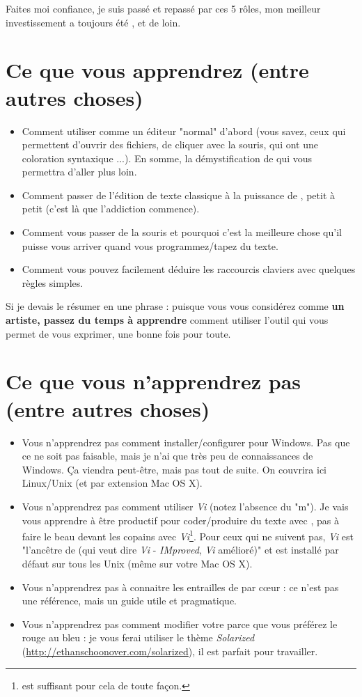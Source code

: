 Faites moi confiance, je suis passé et repassé par ces 5 rôles, mon meilleur investissement a toujours été \vim, et de loin.

\section{Ce que vous apprendrez (entre autres choses)}

\begin{itemize}
    \item Comment utiliser \vim comme un éditeur "normal" d'abord (vous savez, ceux qui permettent d'ouvrir des fichiers, de cliquer avec la souris, qui ont une coloration syntaxique ...). En somme, la démystification de \vim qui vous permettra d'aller plus loin.
    \item Comment passer de l'édition de texte classique à la puissance de \vim, petit à petit (c'est là que l'addiction commence).
    \item Comment vous passer de la souris et pourquoi c'est la meilleure chose qu'il puisse vous arriver quand vous programmez/tapez du texte.
    \item Comment vous pouvez facilement déduire les raccourcis claviers avec quelques règles simples.
\end{itemize}

Si je devais le résumer en une phrase : puisque vous vous considérez comme {\bf un artiste, passez du temps à apprendre} comment utiliser l'outil qui vous permet de vous exprimer, une bonne fois pour toute.

\section{Ce que vous n'apprendrez pas (entre autres choses)}

\begin{itemize}
    \item Vous n'apprendrez pas comment installer/configurer \vim pour Windows. Pas que ce ne soit pas faisable, mais je n'ai que très peu de connaissances de Windows. Ça viendra peut-être, mais pas tout de suite. On couvrira ici Linux/Unix (et par extension Mac OS X).
    \item Vous n'apprendrez pas comment utiliser \emph{Vi} (notez l'absence du "m"). Je vais vous apprendre à être productif pour coder/produire du texte avec \vim, pas à faire le beau devant les copains avec \emph{Vi}\footnote{\vim est suffisant pour cela de toute façon.}. Pour ceux qui ne suivent pas, \emph{Vi} est "l'ancêtre de \vim (qui veut dire \emph{Vi} - \emph{IMproved}, \emph{Vi} amélioré)" et est installé par défaut sur tous les Unix (même sur votre Mac OS X).
    \item Vous n'apprendrez pas à connaitre les entrailles de \vim par c\oe ur : ce n'est pas une référence, mais un guide utile et pragmatique.
    \item Vous n'apprendrez pas comment modifier votre \vim parce que vous préférez le rouge au bleu : je vous ferai utiliser le thème \emph{Solarized} (\url{http://ethanschoonover.com/solarized}), il est parfait pour travailler.
\end{itemize}


